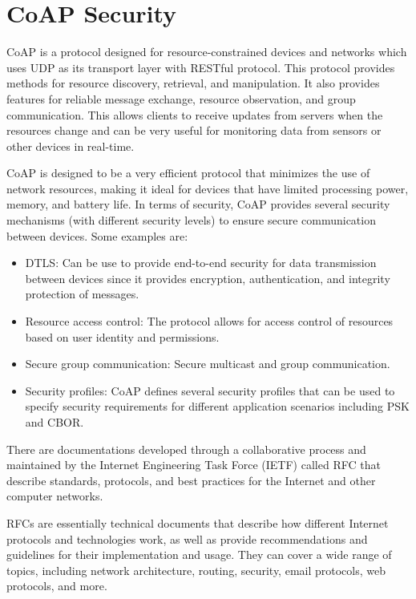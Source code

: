 \section{\acs{CoAP} Security}
\label{sec:report}


\ac{CoAP} is a protocol designed for resource-constrained devices and networks which uses \ac{UDP} as its transport layer with RESTful protocol.
This protocol provides methods for resource discovery, retrieval, and manipulation. It also provides features for reliable message exchange, resource observation, and group communication. 
This allows clients to receive updates from servers when the resources change and can be very useful for monitoring data from sensors or other devices in real-time.

\acs{CoAP} is designed to be a very efficient protocol that minimizes the use of network resources, making it ideal for devices that have limited processing power, memory, and battery life.
In terms of security, \acs{CoAP} provides several security mechanisms (with different security levels) to ensure secure communication between devices. Some examples are:
\begin{itemize}
    \item \ac{DTLS}: Can be use to provide end-to-end security for data transmission between devices since it provides encryption, authentication, and integrity protection of messages.
    \item Resource access control: The protocol allows for access control of resources based on user identity and permissions.
    \item Secure group communication: Secure multicast and group communication.
    \item Security profiles: \acs{CoAP} defines several security profiles that can be used to specify security requirements for different application scenarios including \ac{PSK} and \ac{CBOR}.
\end{itemize}

There are documentations developed through a collaborative process and maintained by the Internet Engineering Task Force (IETF) called \ac{RFC} that describe standards, protocols, and best practices for the Internet and other computer networks.

\acs{RFC}s are essentially technical documents that describe how different Internet protocols and technologies work, as well as provide recommendations and guidelines for their implementation and usage. 
They can cover a wide range of topics, including network architecture, routing, security, email protocols, web protocols, and more.

